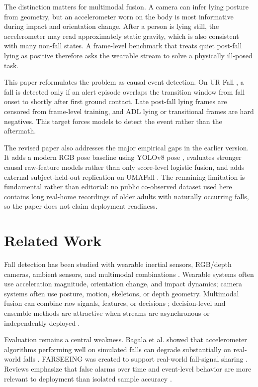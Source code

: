\documentclass[journal]{IEEEtran}
\begin{document}
The distinction matters for multimodal fusion. A camera can infer lying posture from geometry, but an accelerometer worn on the body is most informative during impact and orientation change. After a person is lying still, the accelerometer may read approximately static gravity, which is also consistent with many non-fall states. A frame-level benchmark that treats quiet post-fall lying as positive therefore asks the wearable stream to solve a physically ill-posed task.

This paper reformulates the problem as causal event detection. On UR Fall \cite{Kwolek2014UR,Kepski2018Event}, a fall is detected only if an alert episode overlaps the transition window from fall onset to shortly after first ground contact. Late post-fall lying frames are censored from frame-level training, and ADL lying or transitional frames are hard negatives. This target forces models to detect the event rather than the aftermath.

The revised paper also addresses the major empirical gaps in the earlier version. It adds a modern RGB pose baseline using YOLOv8 pose \cite{Jocher2023Ultralytics}, evaluates stronger causal raw-feature models rather than only score-level logistic fusion, and adds external subject-held-out replication on UMAFall \cite{Casilari2017UMAFall}. The remaining limitation is fundamental rather than editorial: no public co-observed dataset used here contains long real-home recordings of older adults with naturally occurring falls, so the paper does not claim deployment readiness.

\section{Related Work}
Fall detection has been studied with wearable inertial sensors, RGB/depth cameras, ambient sensors, and multimodal combinations \cite{Mubashir2013Survey}. Wearable systems often use acceleration magnitude, orientation change, and impact dynamics; camera systems often use posture, motion, skeletons, or depth geometry. Multimodal fusion can combine raw signals, features, or decisions \cite{Atrey2010Fusion,Baltrusaitis2019Multimodal}; decision-level and ensemble methods are attractive when streams are asynchronous or independently deployed \cite{Dietterich2000Ensemble}.

Evaluation remains a central weakness. Bagala et al. showed that accelerometer algorithms performing well on simulated falls can degrade substantially on real-world falls \cite{Bagala2012RealWorld}. FARSEEING was created to support real-world fall-signal sharing \cite{Klenk2016FARSEEING}. Reviews emphasize that false alarms over time and event-level behavior are more relevant to deployment than isolated sample accuracy \cite{Warrington2018Evaluation}.
\end{document}
